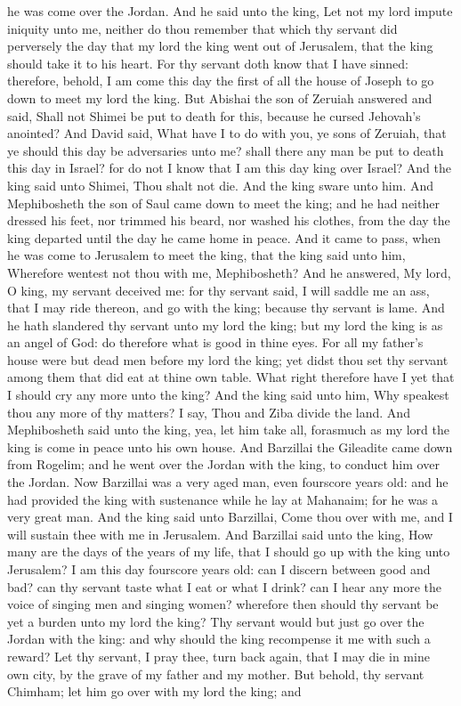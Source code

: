 he was come over the Jordan. And he said unto the king, Let not my lord impute iniquity unto me, neither do thou remember that which thy servant did perversely the day that my lord the king went out of Jerusalem, that the king should take it to his heart. For thy servant doth know that I have sinned: therefore, behold, I am come this day the first of all the house of Joseph to go down to meet my lord the king.  But Abishai the son of Zeruiah answered and said, Shall not Shimei be put to death for this, because he cursed Jehovah’s anointed? And David said, What have I to do with you, ye sons of Zeruiah, that ye should this day be adversaries unto me? shall there any man be put to death this day in Israel? for do not I know that I am this day king over Israel? And the king said unto Shimei, Thou shalt not die. And the king sware unto him.  And Mephibosheth the son of Saul came down to meet the king; and he had neither dressed his feet, nor trimmed his beard, nor washed his clothes, from the day the king departed until the day he came home in peace. And it came to pass, when he was come to Jerusalem to meet the king, that the king said unto him, Wherefore wentest not thou with me, Mephibosheth? And he answered, My lord, O king, my servant deceived me: for thy servant said, I will saddle me an ass, that I may ride thereon, and go with the king; because thy servant is lame. And he hath slandered thy servant unto my lord the king; but my lord the king is as an angel of God: do therefore what is good in thine eyes. For all my father’s house were but dead men before my lord the king; yet didst thou set thy servant among them that did eat at thine own table. What right therefore have I yet that I should cry any more unto the king? And the king said unto him, Why speakest thou any more of thy matters? I say, Thou and Ziba divide the land. And Mephibosheth said unto the king, yea, let him take all, forasmuch as my lord the king is come in peace unto his own house.  And Barzillai the Gileadite came down from Rogelim; and he went over the Jordan with the king, to conduct him over the Jordan. Now Barzillai was a very aged man, even fourscore years old: and he had provided the king with sustenance while he lay at Mahanaim; for he was a very great man. And the king said unto Barzillai, Come thou over with me, and I will sustain thee with me in Jerusalem. And Barzillai said unto the king, How many are the days of the years of my life, that I should go up with the king unto Jerusalem? I am this day fourscore years old: can I discern between good and bad? can thy servant taste what I eat or what I drink? can I hear any more the voice of singing men and singing women? wherefore then should thy servant be yet a burden unto my lord the king? Thy servant would but just go over the Jordan with the king: and why should the king recompense it me with such a reward? Let thy servant, I pray thee, turn back again, that I may die in mine own city, by the grave of my father and my mother. But behold, thy servant Chimham; let him go over with my lord the king; and 